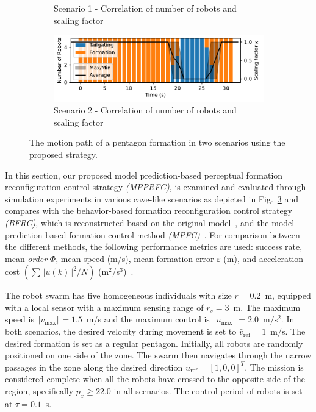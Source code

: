 \begin{figure}
\begin{subfigure}[b]{0.495\textwidth}
    \caption{Scenario 1 - Correlation of number of robots and scaling factor}
    \label{fig:cor1}
    \end{subfigure}
    \begin{subfigure}[b]{0.495\textwidth}
    \includegraphics[width=\textwidth]{paper3/images/correlation_scen2.pdf}
    \caption{Scenario 2 - Correlation of number of robots and scaling factor}
    \label{fig:cor2}
    \end{subfigure}
    \caption{The motion path of a pentagon formation in two scenarios using the proposed strategy.}
    \label{fig:path}
\end{figure}

In this section, our proposed model prediction-based perceptual formation reconfiguration control strategy \textit{(MPPRFC)}, is examined and evaluated through simulation experiments in various cave-like scenarios as depicted in Fig.~\ref{fig:path} and compares with the behavior-based formation reconfiguration control strategy \textit{(BFRC)}, which is reconstructed based on the original model~\cite{736776,Vsrhelyi2018}, and the model prediction-based formation control method \textit{(MPFC)}~\cite{Soria2021,9562281}. For comparison between the different methods, the following performance metrics are used: success rate, mean \textit{order} $\Phi$, mean speed (m/s), mean formation error $\varepsilon$ (m), and acceleration cost $(\sum{\left\Vert u(k)\right\Vert^2}/{N})$ (m$^2$/s$^3$)~\cite{Zhang2021}.

The robot swarm has five homogeneous individuals with size $r=0.2$~m, equipped with a local sensor with a maximum sensing range of $r_s=3$~m. The maximum speed is $\left\Vert v_\text{max}\right\Vert=1.5$~m/s and the maximum control is $\left\Vert u_\text{max}\right\Vert=2.0$~m/s$^2$. In both scenarios, the desired velocity during movement is set to $\bar{v}_\text{ref}=1$~m/s. The desired formation is set as a regular pentagon. Initially, all robots are randomly positioned on one side of the zone. The swarm then navigates through the narrow passages in the zone along the desired direction $u_\text{ref}=[1,0,0]^T$. The mission is considered complete when all the robots have crossed to the opposite side of the region, specifically $p_x\geq22.0$ in all scenarios. The control period of robots is set at $\tau=0.1$~s.


